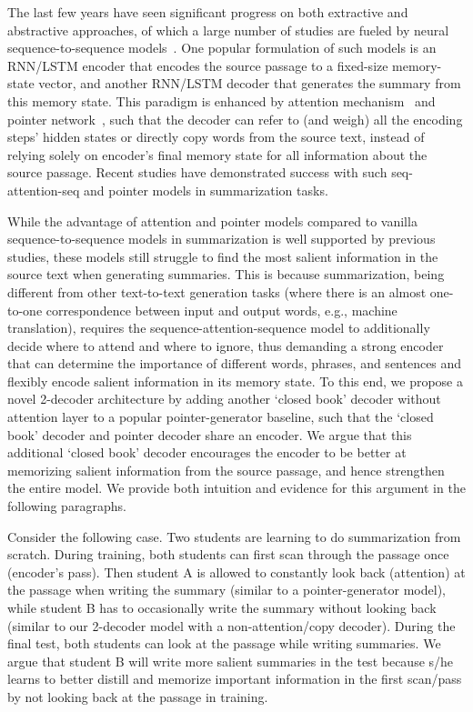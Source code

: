 \documentclass[11pt,a4paper]{article}
\begin{document}
The last few years have seen significant progress on both extractive and abstractive approaches, of which a large number of studies are fueled by neural sequence-to-sequence models~\cite{Sutskever:14}. One popular formulation of such models is an RNN/LSTM encoder that encodes the source passage to a fixed-size memory-state vector, and another RNN/LSTM decoder that generates the summary from this memory state. This paradigm is enhanced by attention mechanism~\cite{Bahdanau:14} and pointer network~\cite{Vinyals:15}, such that the decoder can refer to (and weigh) all the encoding steps' hidden states or directly copy words from the source text, instead of relying solely on encoder's final memory state for all information about the source passage.
Recent studies \cite{Rush:15,Nallapati:16,Chopra:16,Zeng:16,Gu:16,Gulcehre:16,See:17} have demonstrated success with such seq-attention-seq and pointer models in summarization tasks.


While the advantage of attention and pointer models compared to vanilla sequence-to-sequence models in summarization is well supported by previous studies, these models still struggle to find the most salient information in the source text when generating summaries. This is because summarization, being different from other text-to-text generation tasks (where there is an almost one-to-one correspondence between input and output words, e.g., machine translation), requires the sequence-attention-sequence model to additionally decide where to attend and where to ignore, thus demanding a strong encoder that can determine the importance of different words, phrases, and sentences and flexibly encode salient information in its memory state.
To this end, we propose a novel 2-decoder architecture by adding another `closed book' decoder without attention layer to a popular pointer-generator baseline, such that the `closed book' decoder and pointer decoder share an encoder. 
We argue that this additional `closed book' decoder encourages the encoder to be better at memorizing salient information from the source passage, and hence strengthen the entire model.
We provide both intuition and evidence for this argument in the following paragraphs.

Consider the following case. Two students are learning to do summarization from scratch. During training, both students can first scan through the passage once (encoder's pass). Then student A is allowed to constantly look back (attention) at the passage when writing the summary (similar to a pointer-generator model), while student B has to occasionally write the summary without looking back (similar to our 2-decoder model with a non-attention/copy decoder). During the final test, both students can look at the passage while writing summaries. We argue that student B will write more salient summaries in the test because s/he learns to better distill and memorize important information in the first scan/pass by not looking back at the passage in training.
\end{document}
